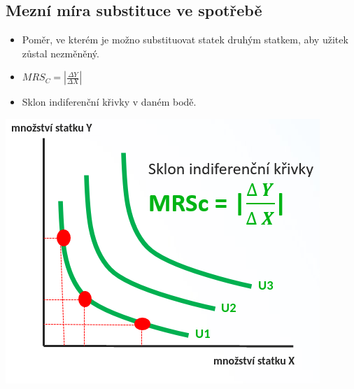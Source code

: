 \subsection{Mezní míra substituce ve spotřebě}
\begin{itemize}
    \item Poměr, ve kterém je možno substituovat statek druhým statkem, aby užitek zůstal nezměněný.
    \item $MRS_C=|\frac{\Delta Y}{\Delta X}|$
    \item Sklon indiferenční křivky v daném bodě.
\end{itemize}
\includegraphics{images/06_mrsc.png}

